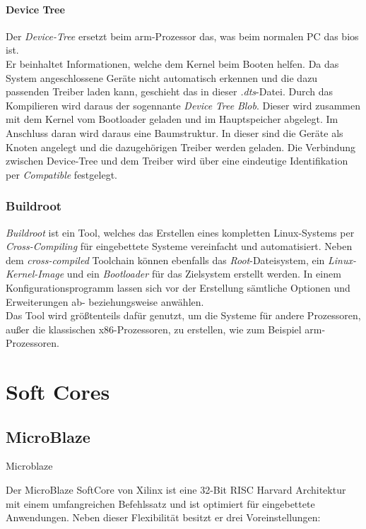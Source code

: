 \subsubsection{Device Tree}\label{kap:devicetree}


Der \emph{Device-Tree} ersetzt beim \ac{arm}-Prozessor das, was beim normalen PC das \ac{bios} ist. \\
Er beinhaltet
Informationen, welche dem Kernel beim Booten helfen. Da das System angeschlossene Geräte nicht automatisch erkennen
und die dazu passenden Treiber laden kann, geschieht das in dieser \emph{.dts}-Datei. Durch das Kompilieren wird daraus
der sogennante \emph{Device} \emph{Tree} \emph{Blob}. Dieser wird zusammen mit dem Kernel vom Bootloader geladen und im
Hauptspeicher abgelegt. Im Anschluss daran wird daraus eine Baumstruktur. In dieser sind die Geräte als Knoten angelegt
und die dazugehörigen Treiber werden geladen. Die Verbindung zwischen Device-Tree und dem Treiber wird über eine
eindeutige Identifikation per \emph{Compatible} festgelegt.


\subsection{Buildroot}\label{kap:buildroot}

\emph{Buildroot} ist ein Tool, welches das Erstellen eines kompletten Linux-Systems per
\emph{Cross-Compiling} für eingebettete Systeme vereinfacht und automatisiert.  Neben dem
\emph{cross-compiled} Toolchain können ebenfalls das \emph{Root}-Dateisystem, ein \emph{Linux-Kernel-Image}
und ein \emph{Bootloader} für das Zielsystem erstellt werden.  In einem Konfigurationsprogramm lassen sich vor der
Erstellung sämtliche Optionen und Erweiterungen ab- beziehungsweise anwählen. \\
Das Tool wird größtenteils dafür genutzt, um die Systeme für andere Prozessoren, außer die klassischen x86-Prozessoren,
zu erstellen, wie zum Beispiel \ac{arm}-Prozessoren.\cite{buildroot}\\

\chapter{Soft Cores}\label{kap:softcores}
\section{MicroBlaze}\label{kap:microblaze}
Microblaze

Der MicroBlaze SoftCore von Xilinx ist eine 32-Bit RISC Harvard Architektur mit einem umfangreichen Befehlssatz und ist optimiert für eingebettete Anwendungen.
Neben dieser Flexibilität besitzt er drei Voreinstellungen:

